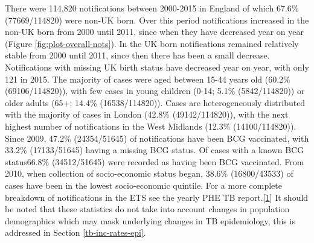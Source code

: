 \documentclass[11pt,twoside]{bristolthesis}
\begin{document}
  There were 114,820 notifications between 2000-2015 in England of which 67.6\% (77669/114820) were non-UK born. Over this period notifications increased in the non-UK born from 2000 until 2011, since when they have decreased year on year (Figure \ref{fig:plot-overall-nots}). In the UK born notifications remained relatively stable from 2000 until 2011, since then there has been a small decrease. Notifications with missing UK birth status have decreased year on year, with only 121 in 2015. The majority of cases were aged between 15-44 years old (60.2\% (69106/114820)), with few cases in young children (0-14; 5.1\% (5842/114820)) or older adults (65+; 14.4\% (16538/114820)). Cases are heterogeneously distributed with the majority of cases in London (42.8\% (49142/114820)), with the next highest number of notifications in the West Midlands (12.3\% (14100/114820)). Since 2009, 47.2\% (24354/51645) of notifications have been BCG vaccinated, with 33.2\% (17133/51645) having a missing BCG status. Of cases with a known BCG status66.8\% (34512/51645) were recorded as having been BCG vaccinated. From 2010, when collection of socio-economic status began, 38.6\% (16800/43533) of cases have been in the lowest socio-economic quintile. For a more complete breakdown of notifications in the ETS see the yearly PHE TB report.{[}\protect\hyperlink{ref-PHE2017}{1}{]} It should be noted that these statistics do not take into account changes in population demographics which may mask underlying changes in TB epidemiology, this is addressed in Section \ref{tb-inc-rates-epi}.
\end{document}
